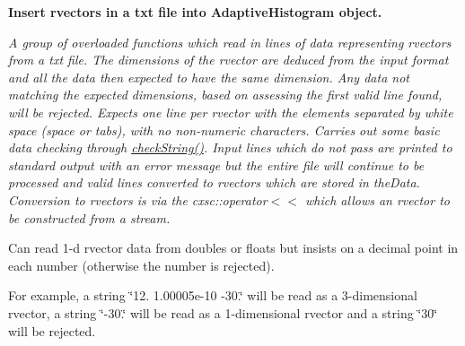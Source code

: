 \begin{Indent}{\bf \-Insert rvectors in a txt file into \-Adaptive\-Histogram object.}\par
{\em \-A group of overloaded functions which read in lines of data representing rvectors from a txt file. \-The dimensions of the rvector are deduced from the input format and all the data then expected to have the same dimension. \-Any data not matching the expected dimensions, based on assessing the first valid line found, will be rejected. \-Expects one line per rvector with the elements separated by white space (space or tabs), with no non-\/numeric characters. \-Carries out some basic data checking through \hyperlink{namespacesubpavings_af62c725dd362922c15d45983e2d8f6cf}{check\-String()}. \-Input lines which do not pass are printed to standard output with an error message but the entire file will continue to be processed and valid lines converted to rvectors which are stored in the\-Data. \-Conversion to rvectors is via the cxsc\-::operator$<$$<$ which allows an rvector to be constructed from a stream.

\-Can read 1-\/d rvector data from doubles or floats but insists on a decimal point in each number (otherwise the number is rejected).

\-For example, a string \char`\"{}12. 1.\-00005e-\/10 -\/30.\char`\"{} will be read as a 3-\/dimensional rvector, a string \char`\"{}-\/30.\char`\"{} will be read as a 1-\/dimensional rvector and a string \char`\"{}30\char`\"{} will be rejected.


}
\end{Indent}
